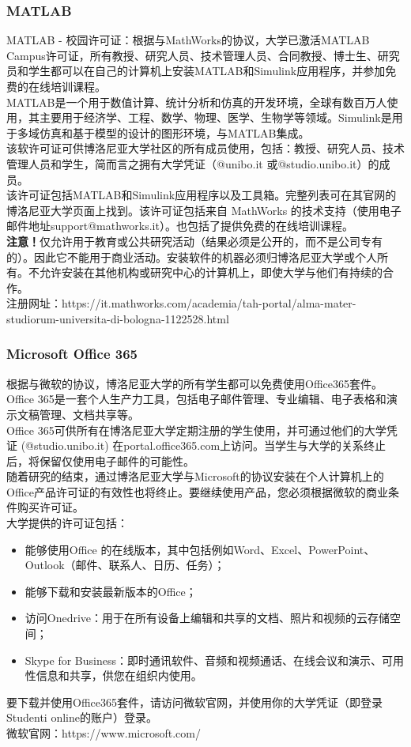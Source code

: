 \subsubsection{MATLAB}
MATLAB - 校园许可证：根据与MathWorks的协议，大学已激活MATLAB Campus许可证，所有教授、研究人员、技术管理人员、合同教授、博士生、研究员和学生都可以在自己的计算机上安装MATLAB和Simulink应用程序，并参加免费的在线培训课程。\\
MATLAB是一个用于数值计算、统计分析和仿真的开发环境，全球有数百万人使用，其主要用于经济学、工程、数学、物理、医学、生物学等领域。Simulink是用于多域仿真和基于模型的设计的图形环境，与MATLAB集成。\\
该软许可证可供博洛尼亚大学社区的所有成员使用，包括：教授、研究人员、技术管理人员和学生，简而言之拥有大学凭证（@unibo.it 或@studio.unibo.it）的成员。\\
该许可证包括MATLAB和Simulink应用程序以及工具箱。完整列表可在其官网的博洛尼亚大学页面上找到。该许可证包括来自 MathWorks 的技术支持（使用电子邮件地址support@mathworks.it）。也包括了提供免费的在线培训课程。\\
\textbf{注意！}仅允许用于教育或公共研究活动（结果必须是公开的，而不是公司专有的）。因此它不能用于商业活动。安装软件的机器必须归博洛尼亚大学或个人所有。不允许安装在其他机构或研究中心的计算机上，即使大学与他们有持续的合作。\\
注册网址：https://it.mathworks.com/academia/tah-portal/alma-mater-studiorum-universita-di-bologna-1122528.html

\subsubsection{Microsoft Office 365}
根据与微软的协议，博洛尼亚大学的所有学生都可以免费使用Office365套件。\\
Office 365是一套个人生产力工具，包括电子邮件管理、专业编辑、电子表格和演示文稿管理、文档共享等。\\
Office 365可供所有在博洛尼亚大学定期注册的学生使用，并可通过他们的大学凭证 (@studio.unibo.it) 在portal.office365.com上访问。当学生与大学的关系终止后，将保留仅使用电子邮件的可能性。\\
随着研究的结束，通过博洛尼亚大学与Microsoft的协议安装在个人计算机上的Office产品许可证的有效性也将终止。要继续使用产品，您必须根据微软的商业条件购买许可证。\\
大学提供的许可证包括：
\begin{itemize}
 \item 能够使用Office 的在线版本，其中包括例如Word、Excel、PowerPoint、Outlook（邮件、联系人、日历、任务）；
 \item 能够下载和安装最新版本的Office； 
 \item 访问Onedrive：用于在所有设备上编辑和共享的文档、照片和视频的云存储空间；
 \item Skype for Business：即时通讯软件、音频和视频通话、在线会议和演示、可用性信息和共享，供您在组织内使用。
\end{itemize}
要下载并使用Office365套件，请访问微软官网，并使用你的大学凭证（即登录Studenti online的账户）登录。\\
微软官网：https://www.microsoft.com/

